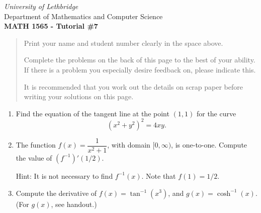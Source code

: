 \documentclass[12pt]{article}
\newcommand{\points}[1]{\marginpar{\hspace{24pt}[#1]}}
\newcommand{\skipline}{\vspace{12pt}}
\begin{document}
\author{Instructor: Sean Fitzpatrick}
\thispagestyle{empty}
\begin{center}
\emph{University of Lethbridge}\\
Department of Mathematics and Computer Science\\
{\bf MATH 1565 - Tutorial \#7}\\
\end{center}



\vspace{0.1in}

\vspace*{\fill}

\begin{quote}
Print your name and student number clearly in the space above. 

\medskip

Complete the problems on the back of this page to the best of your ability. If there is a problem you especially desire feedback on, please indicate this. 

\medskip

It is recommended that you work out the details on scrap paper before writing your solutions on this page.
\end{quote}
\newpage

\begin{enumerate}
  \item Find the equation of the tangent line at the point $(1,1)$ for the curve \points{5}
  \[
  (x^2+y^2)^2=4xy.
  \]
 
 
 
 \vspace{7cm}
 
 
 
 
 \item The function $f(x)=\dfrac{1}{x^2+1}$, with domain $[0,\infty)$, is one-to-one. \points{2} Compute the value of $(f^{-1})'(1/2)$.
 
 Hint: It is not necessary to find $f^{-1}(x)$. Note that $f(1)=1/2$.
 
 \vspace{4cm}
 
 \item Compute the derivative of $f(x) = \tan^{-1}(x^3)$, and $g(x) = \cosh^{-1}(x)$. (For $g(x)$, see handout.) \points{3}
\end{enumerate}
\end{document}
